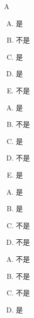 {{        %
        \begin{practices}
            A
        \end{practices}

        \begin{practices}
            \begin{enumerate}[A.]
                \item 是
                \item 不是
                \item 是
                \item 是
                \item 不是
            \end{enumerate}
        \end{practices}

        \begin{practices}
            \begin{enumerate}[A.]
                \item 是
                \item 不是
                \item 是
                \item 不是
                \item 是
            \end{enumerate}
        \end{practices}

        \begin{practices}
            \begin{enumerate}[A.]
                \item 是
                \item 是
                \item 不是
                \item 不是
            \end{enumerate}
        \end{practices}

        \begin{practices}
            \begin{enumerate}[A.]
                \item 不是
                \item 不是
                \item 不是
                \item 是
            \end{enumerate}
        \end{practices}

}}
